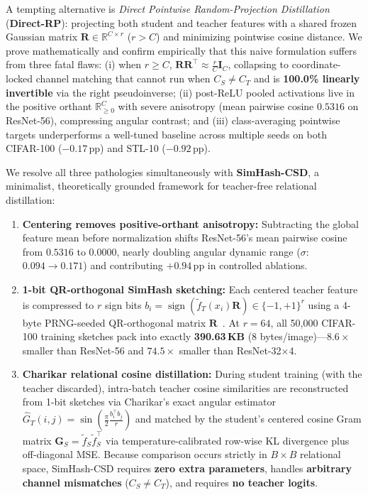 \documentclass{article}
\begin{document}
A tempting alternative is \emph{Direct Pointwise Random-Projection Distillation} (\textbf{Direct-RP}): projecting both student and teacher features with a shared frozen Gaussian matrix $\mathbf{R}\in\mathbb{R}^{C\times r}$ ($r>C$) and minimizing pointwise cosine distance. We prove mathematically and confirm empirically that this naive formulation suffers from three fatal flaws: (i) when $r \ge C$, $\mathbf{R}\mathbf{R}^\top \approx \frac{r}{C}\mathbf{I}_C$, collapsing to coordinate-locked channel matching that cannot run when $C_S \neq C_T$ and is \textbf{100.0\% linearly invertible} via the right pseudoinverse; (ii) post-ReLU pooled activations live in the positive orthant $\mathbb{R}_{\ge 0}^C$ with severe anisotropy (mean pairwise cosine $0.5316$ on ResNet-56), compressing angular contrast; and (iii) class-averaging pointwise targets underperforms a well-tuned baseline across multiple seeds on both CIFAR-100 ($-0.17$\,pp) and STL-10 ($-0.92$\,pp).

We resolve all three pathologies simultaneously with \textbf{SimHash-CSD}, a minimalist, theoretically grounded framework for teacher-free relational distillation:
\begin{enumerate}
    \item \textbf{Centering removes positive-orthant anisotropy:} Subtracting the global feature mean before normalization shifts ResNet-56's mean pairwise cosine from $0.5316$ to $0.0000$, nearly doubling angular dynamic range ($\sigma$: $0.094 \to 0.171$) and contributing $+0.94$\,pp in controlled ablations.
    \item \textbf{1-bit QR-orthogonal SimHash sketching:} Each centered teacher feature is compressed to $r$ sign bits $b_i = \operatorname{sign}(\tilde{f}_T(x_i)\mathbf{R}) \in \{-1,+1\}^r$ using a 4-byte PRNG-seeded QR-orthogonal matrix $\mathbf{R}$~\citep{choromanski2017unreasonable}. At $r=64$, all 50,000 CIFAR-100 training sketches pack into exactly \textbf{390.63\,KB} (8 bytes/image)---$8.6\times$ smaller than ResNet-56 and $74.5\times$ smaller than ResNet-32$\times$4.
    \item \textbf{Charikar relational cosine distillation:} During student training (with the teacher discarded), intra-batch teacher cosine similarities are reconstructed from 1-bit sketches via Charikar's exact angular estimator~\citep{charikar2002similarity} $\hat{G}_T(i,j)=\sin(\frac{\pi}{2}\frac{b_i^\top b_j}{r})$ and matched by the student's centered cosine Gram matrix $\mathbf{G}_S = \tilde{f}_S\tilde{f}_S^\top$ via temperature-calibrated row-wise KL divergence plus off-diagonal MSE. Because comparison occurs strictly in $B\times B$ relational space, SimHash-CSD requires \textbf{zero extra parameters}, handles \textbf{arbitrary channel mismatches} ($C_S \neq C_T$), and requires \textbf{no teacher logits}.
\end{enumerate}
\end{document}
